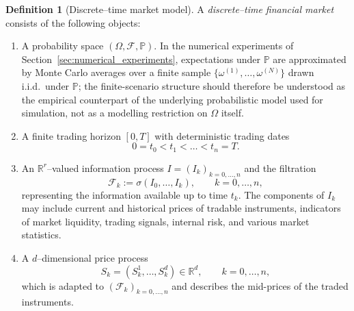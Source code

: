 \documentclass[12pt,a4paper]{article}
\theoremstyle{definition}
\newtheorem{definition}{Definition}[section]
\theoremstyle{plain}
\theoremstyle{remark}
\theoremstyle{plain}
\begin{document}
\begin{definition}[Discrete--time market model]
\label{def:discrete_time_market}
A \emph{discrete--time financial market} consists of the following objects:
\begin{enumerate}
    \item A probability space $(\Omega,\mathcal F,\mathbb P)$. In the numerical experiments of Section~\ref{sec:numerical_experiments}, expectations under $\mathbb{P}$ are approximated by Monte Carlo averages over a finite sample $\{\omega^{(1)},\dots,\omega^{(N)}\}$ drawn i.i.d.\ under $\mathbb{P}$; the finite-scenario structure should therefore be understood as the empirical counterpart of the underlying probabilistic model used for simulation, not as a modelling restriction on $\Omega$ itself.
    \item A finite trading horizon $[0,T]$ with deterministic trading dates
    \[
        0 = t_0 < t_1 < \dots < t_n = T.
    \]
    \item An $\mathbb R^r$--valued information process $I=(I_k)_{k=0,\dots,n}$ and the filtration
    \[
        \mathcal F_k := \sigma(I_0,\dots,I_k), \qquad k=0,\dots,n,
    \]
    representing the information available up to time $t_k$. The components of $I_k$ may include current and historical prices of tradable instruments, indicators of market liquidity, trading signals, internal risk, and various market statistics.

    \item A $d$--dimensional price process 
    \[
        S_k = (S^1_k,\dots,S^d_k)\in\mathbb R^d, \qquad k=0,\dots,n,
    \]
    which is adapted to $(\mathcal F_k)_{k=0,\dots,n}$ and describes the mid-prices of the traded instruments.
\end{enumerate}
\end{definition}
\end{document}
